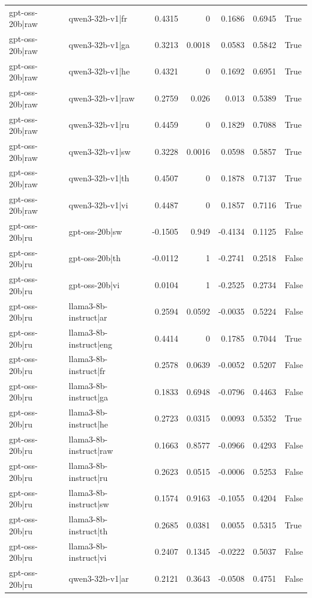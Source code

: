 \begin{table}
\begin{tabular}{l l r r r r l}
gpt-oss-20b|raw & qwen3-32b-v1|fr & 0.4315 & 0 & 0.1686 & 0.6945 & True \\
gpt-oss-20b|raw & qwen3-32b-v1|ga & 0.3213 & 0.0018 & 0.0583 & 0.5842 & True \\
gpt-oss-20b|raw & qwen3-32b-v1|he & 0.4321 & 0 & 0.1692 & 0.6951 & True \\
gpt-oss-20b|raw & qwen3-32b-v1|raw & 0.2759 & 0.026 & 0.013 & 0.5389 & True \\
gpt-oss-20b|raw & qwen3-32b-v1|ru & 0.4459 & 0 & 0.1829 & 0.7088 & True \\
gpt-oss-20b|raw & qwen3-32b-v1|sw & 0.3228 & 0.0016 & 0.0598 & 0.5857 & True \\
gpt-oss-20b|raw & qwen3-32b-v1|th & 0.4507 & 0 & 0.1878 & 0.7137 & True \\
gpt-oss-20b|raw & qwen3-32b-v1|vi & 0.4487 & 0 & 0.1857 & 0.7116 & True \\
gpt-oss-20b|ru & gpt-oss-20b|sw & -0.1505 & 0.949 & -0.4134 & 0.1125 & False \\
gpt-oss-20b|ru & gpt-oss-20b|th & -0.0112 & 1 & -0.2741 & 0.2518 & False \\
gpt-oss-20b|ru & gpt-oss-20b|vi & 0.0104 & 1 & -0.2525 & 0.2734 & False \\
gpt-oss-20b|ru & llama3-8b-instruct|ar & 0.2594 & 0.0592 & -0.0035 & 0.5224 & False \\
gpt-oss-20b|ru & llama3-8b-instruct|eng & 0.4414 & 0 & 0.1785 & 0.7044 & True \\
gpt-oss-20b|ru & llama3-8b-instruct|fr & 0.2578 & 0.0639 & -0.0052 & 0.5207 & False \\
gpt-oss-20b|ru & llama3-8b-instruct|ga & 0.1833 & 0.6948 & -0.0796 & 0.4463 & False \\
gpt-oss-20b|ru & llama3-8b-instruct|he & 0.2723 & 0.0315 & 0.0093 & 0.5352 & True \\
gpt-oss-20b|ru & llama3-8b-instruct|raw & 0.1663 & 0.8577 & -0.0966 & 0.4293 & False \\
gpt-oss-20b|ru & llama3-8b-instruct|ru & 0.2623 & 0.0515 & -0.0006 & 0.5253 & False \\
gpt-oss-20b|ru & llama3-8b-instruct|sw & 0.1574 & 0.9163 & -0.1055 & 0.4204 & False \\
gpt-oss-20b|ru & llama3-8b-instruct|th & 0.2685 & 0.0381 & 0.0055 & 0.5315 & True \\
gpt-oss-20b|ru & llama3-8b-instruct|vi & 0.2407 & 0.1345 & -0.0222 & 0.5037 & False \\
gpt-oss-20b|ru & qwen3-32b-v1|ar & 0.2121 & 0.3643 & -0.0508 & 0.4751 & False \\

\end{tabular}
\end{table}
